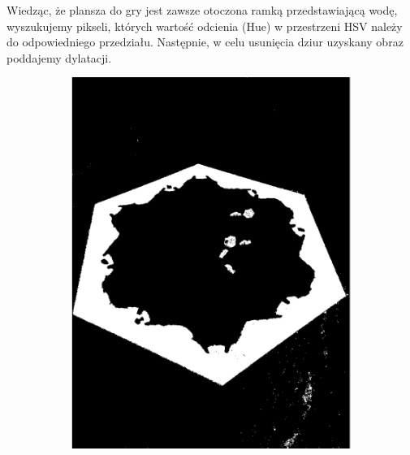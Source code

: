 \documentclass[a4paper]{article}
\begin{document}
    Wiedząc, że plansza do gry jest zawsze otoczona ramką przedstawiającą wodę, wyszukujemy pikseli, których wartość odcienia (Hue) w przestrzeni HSV należy do odpowiedniego przedziału. Następnie, w celu usunięcia dziur uzyskany obraz poddajemy dylatacji.
    \begin{figure}[H]
        \centering
        \begin{subfigure}[t]{.3\linewidth}
        \includegraphics[width=\linewidth]{pictures/steps/find_water.png}
        \end{subfigure}
        \begin{subfigure}[t]{.3\linewidth}

\end{subfigure}
\end{figure}
\end{document}
